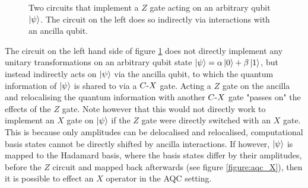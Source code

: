 \begin{figure}[h]
    \begin{center}
    \caption{Two circuits that implement a $Z$ gate acting on an arbitrary qubit $\ket{\psi}$. The circuit on the left does so indirectly via interactions with an ancilla qubit.}
    \label{figure:aqc_Z}
    \end{center}
\end{figure}
The circuit on the left hand side of figure \ref{figure:aqc_Z} does not directly implement any unitary transformations on an arbitrary qubit state $\ket{\psi} = \alpha \ket{0} + \beta \ket{1}$, but instead indirectly acts on $\ket{\psi}$ via the ancilla qubit, to which the quantum information of $\ket{\psi}$ is shared to via a $C\text{-}X$ gate.
Acting a $Z$ gate on the ancilla and relocalising the quantum information with another $C\text{-}X$ gate "passes on" the effects of the $Z$ gate.
Note however that this would not directly work to implement an $X$ gate on $\ket{\psi}$ if the $Z$ gate were directly switched with an $X$ gate.
This is because only amplitudes can be delocalised and relocalised, computational basis states cannot be directly shifted by ancilla interactions.
If however, $\ket{\psi}$ is mapped to the Hadamard basis, where the basis states differ by their amplitudes, before the $Z$ circuit and mapped back afterwards (see figure \ref{figure:aqc_X}), then it is possible to effect an $X$ operator in the AQC setting.

